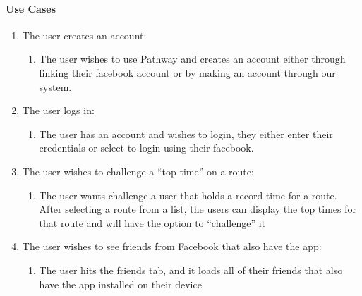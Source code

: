 \documentclass{article}
\begin{document}
\paragraph{Use Cases}
\begin{enumerate}
\item The user creates an account:
    \begin{enumerate}
    \item The user wishes to use Pathway and creates an account either through linking their facebook account or by making an account through our system.
    \end{enumerate}
\item The user logs in:
    \begin{enumerate}
    \item The user has an account and wishes to login, they either enter their credentials or select to login using their facebook.
    \end{enumerate}
\item The user wishes to challenge a “top time” on a route:
    \begin{enumerate}
    \item The user wants challenge a user that holds a record time for a route. After selecting a route from a list, the users can display the top times for that route and will have the option to “challenge” it
    \end{enumerate}
\item The user wishes to see friends from Facebook that also have the app:
    \begin{enumerate}
    \item The user hits the friends tab, and it loads all of their friends that also have the app installed on their device
    \end{enumerate}
\end{enumerate}
\pagebreak
\end{document}
